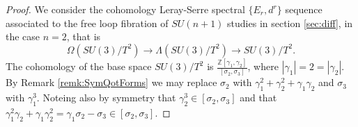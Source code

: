 \documentclass{article}
\theoremstyle{plain}
\theoremstyle{definition}
\numberwithin{thm}{section}
\begin{document}
			\begin{proof}
				We consider the cohomology Leray-Serre spectral $\{ E_r,d^r \}$ sequence associated to the free loop fibration of $SU(n+1)$ studies in section \ref{sec:diff},
				in the case $n=2$, that is
				\begin{equation*}
					\Omega(SU(3)/T^2)\to\Lambda(SU(3)/T^2)\to SU(3)/T^2.
				\end{equation*}
				The cohomology of the base space $SU(3)/T^2$ is $\frac{\mathbb{Z}[\gamma_1,\gamma_2]}{[\sigma_2,\sigma_3]}$,
				where $|\gamma_1|=2=|\gamma_2|$.
				By Remark \ref{remk:SymQotForms} we may replace
				$\sigma_2$ with $\gamma_1^2+\gamma_2^2+\gamma_1\gamma_2$ and $\sigma_3$ with $\gamma_1^3$.
				Noteing also by symmetry that $\gamma_2^3\in[\sigma_2,\sigma_3]$
				and that $\gamma_1^2\gamma_2+\gamma_1\gamma_2^2=\gamma_1\sigma_2-\sigma_3\in[\sigma_2,\sigma_3]$.
				

\end{proof}
\end{document}
